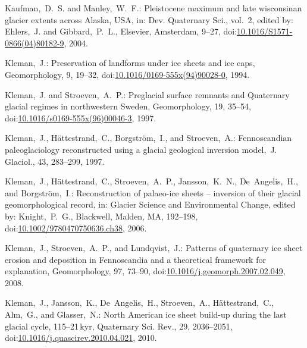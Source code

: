 \documentclass[tc, manuscript]{copernicus}
\begin{document}
\begin{thebibliography}{114}
Kaufman,~D.~S. and Manley,~W.~F.: Pleistocene maximum and late wisconsinan glacier extents across Alaska, {USA}, in: Dev. Quaternary Sci., vol.~2,
edited by: Ehlers,~J. and Gibbard,~P.~L., Elsevier, Amsterdam, 9--27,
doi:\href{http://dx.doi.org/10.1016/S1571-0866(04)80182-9}{10.1016/S1571-0866(04)80182-9}, 2004.


Kleman,~J.: Preservation of landforms under ice sheets and ice caps, Geomorphology, 9, 19--32,
doi:\href{http://dx.doi.org/10.1016/0169-555x(94)90028-0}{10.1016/0169-555x(94)90028-0}, 1994.


Kleman,~J. and Stroeven,~A.~P.: Preglacial surface remnants and Quaternary glacial regimes in northwestern Sweden, Geomorphology, 19, 35--54,
doi:\href{http://dx.doi.org/10.1016/s0169-555x(96)00046-3}{10.1016/s0169-555x(96)00046-3}, 1997.


Kleman,~J., H{\"a}ttestrand,~C., Borgstr{\"o}m,~I., and Stroeven,~A.: Fennoscandian paleoglaciology reconstructed using a glacial geological inversion model,~J. Glaciol., 43, 283--299, 1997.


Kleman,~J., H{\"a}ttestrand,~C., Stroeven,~A.~P., Jansson,~K.~N., De~Angelis,~H., and Borgstr{\"o}m,~I.: Reconstruction of palaeo-ice sheets -- inversion of their glacial geomorphological record, in: Glacier Science and Environmental Change, edited by: Knight,~P.~G., Blackwell, Malden, MA, 192--198,
doi:\href{http://dx.doi.org/10.1002/9780470750636.ch38}{10.1002/9780470750636.ch38}, 2006.


Kleman,~J., Stroeven,~A.~P., and Lundqvist,~J.: Patterns of quaternary ice sheet erosion and deposition in Fennoscandia and a theoretical framework for explanation, Geomorphology, 97, 73--90,
doi:\href{http://dx.doi.org/10.1016/j.geomorph.2007.02.049}{10.1016/j.geomorph.2007.02.049}, 2008.


Kleman,~J., Jansson,~K., De~Angelis,~H., Stroeven,~A., H\"{a}ttestrand,~C., Alm,~G., and Glasser,~N.: North American ice sheet build-up during the last glacial cycle, 115--21\,kyr, Quaternary Sci. Rev., 29, 2036--2051,
doi:\href{http://dx.doi.org/10.1016/j.quascirev.2010.04.021}{10.1016/j.quascirev.2010.04.021}, 2010.



\end{thebibliography}
\end{document}
